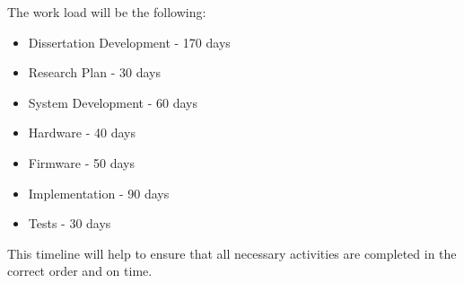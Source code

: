 The work load will be the following:
\begin{itemize}
    \item Dissertation Development - 170 days
    \item Research Plan - 30 days
    \item System Development - 60 days
    \item Hardware - 40 days
    \item Firmware - 50 days
    \item Implementation - 90 days
    \item Tests - 30 days
\end{itemize}

This timeline will help to ensure that all necessary activities are completed in the correct order and on time.
